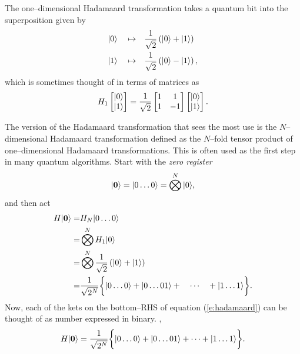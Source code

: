 The one--dimensional Hadamaard transformation takes a quantum bit into the
superposition given by
\begin{equation}
\begin{split}
{|{0}\rangle}\quad\mapsto&\quad\frac{1}{\sqrt{2}}\left({|{0}\rangle} +{|{1}\rangle}\right)\\
{|{1}\rangle}\quad\mapsto&\quad\frac{1}{\sqrt{2}}\left({|{0}\rangle} -{|{1}\rangle}\right),
\end{split}
\end{equation}
which is sometimes thought of in terms of matrices as
\begin{equation}
H_1 \left[\begin{matrix}{|{0}\rangle}\\ {|{1}\rangle}\end{matrix}\right]
= \frac{1}{\sqrt{2}}
\left[\begin{matrix}1&1\\ 1&-1\end{matrix}\right]
\left[\begin{matrix}{|{0}\rangle}\\ {|{1}\rangle}\end{matrix}\right].
\end{equation}

The version of the Hadamaard transformation that sees the most use is
the $N$--dimensional Hadamaard transformation defined as the $N$--fold
tensor product of one--dimensional Hadamaard transformations.
This is often used as the first step in many quantum algorithms.
Start with the \emph{zero register}
\begin{equation}
{|{\bf 0}\rangle}={|{0\ldots 0}\rangle} = \bigotimes^N{|{0}\rangle},
\end{equation}
and then act
\begin{equation}
\begin{split}
H{|{\bf 0}\rangle} =& H_N{|{0\ldots 0}\rangle}\\
=& \bigotimes^N H_1{|{0}\rangle}\\
=& \bigotimes^N \frac{1}{\sqrt{2}}\left({|{0}\rangle} +{|{1}\rangle}\right)\\
=& \frac{1}{\sqrt{2^N}}\biggl\lbrace {|{0\ldots 0}\rangle} + {|{0\ldots 01}\rangle} +
\quad\cdots\quad + {|{1\ldots 1}\rangle}\biggr\rbrace.
\end{split}
\label{e:hadamaard}
\end{equation}
Now, each of the kets on the bottom--RHS of equation (\ref{e:hadamaard})
can be thought of as number expressed in binary. \ie,
\begin{equation}
H{|{\bf 0}\rangle} = \frac{1}{\sqrt{2^N}}\biggl\lbrace {|{0\ldots 0}\rangle} + {|{0\ldots 01}\rangle} + \cdots 
+ {|{1\ldots 1}\rangle}\biggr\rbrace.
\end{equation}







